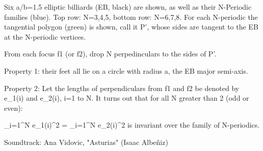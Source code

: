 Six a/b=1.5 elliptic billiards (EB, black) are shown, as well as their N-Periodic families (blue). Top row: N=3,4,5, bottom row: N=6,7,8. For each N-periodic the tangential polygon (green) is shown, call it P', whose sides are tangent to the EB at the N-periodic vertices.

From each focus f1 (or f2), drop N perpedinculars to the sides of P'.

Property 1: their feet all lie on a circle with radius a, the 
EB major semi-axis.

Property 2: Let the lengths of perpendiculars from f1 and f2 be denoted by e_1(i) and e_2(i), i=1 to N. It turns out that for all N greater than 2 (odd or even):

\sum_{i=1}^N{ e_1(i)^2 } = \sum_{i=1}^N{ e_2(i)^2 } is invariant over the family of N-periodics.

Soundtrack: Ana Vidovic, "Asturias" (Isaac Albeñiz)